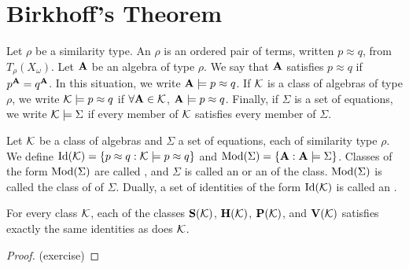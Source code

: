 \section{Birkhoff's Theorem}
\begin{definition}
Let $\rho$ be a similarity type. 
An  $\rho$ is an ordered pair of terms, written 
$p \approx q$, from $T_\rho(X_\omega)$. Let $\mathbf{A}$ be an algebra of type $\rho$.
We say that $\mathbf{A}$ satisfies $p\approx q$ if $p^{\mathbf{A}} = q^{\mathbf{A}}$. 
In this situation, we write $\mathbf{A} \models p \approx q$.
If $\mathcal{K}$ is a class of algebras of type $\rho$, we write 
$\mathcal{K} \models p \approx q$ if $\forall \mathbf{A} \in \mathcal{K}$, 
$\mathbf{A} \models p \approx q$. Finally, if $\Sigma$ is a set of equations, 
we write $\mathcal{K} \models \Sigma$ if every member of $\mathcal{K}$ satisfies
every member of $\Sigma$.
\end{definition}

\begin{definition} Let $\mathcal{K}$ be a class of algebras and $\Sigma$ a set of equations, each 
of similarity type $\rho$. We define 
$\operatorname{Id}(\mathcal{K}) = \{p \approx q : \mathcal{K} \models p \approx q\}$ 
and
$\operatorname{Mod}(\Sigma) = \{ \mathbf{A} : \mathbf{A} \models \Sigma \}$.
Classes of the form $\operatorname{Mod}(\Sigma)$ are called , and $\Sigma$ is called 
an  or an  of the class. $\operatorname{Mod}(\Sigma)$ is called the 
class of  of $\Sigma$. Dually, a set of identities of the form $\operatorname{Id}(\mathcal{K})$ is called an 
.
\end{definition}

\begin{lemma} 
  \label{lem:4.36} 
  For every class $\mathcal{K}$, each of the classes $\mathbf{S}(\mathcal{K})$, 
  $\mathbf{H}(\mathcal{K})$, $\mathbf{P}(\mathcal{K})$, and $\mathbf{V}(\mathcal{K})$ satisfies 
  exactly the same identities as does $\mathcal{K}$.
\end{lemma}
\begin{proof} (exercise) \end{proof}


